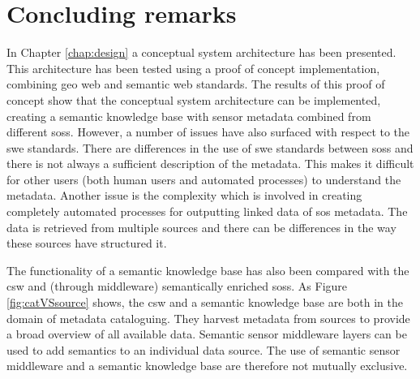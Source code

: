 \section{Concluding remarks}
In Chapter \ref{chap:design} a conceptual system architecture has been presented. This architecture has been tested using a proof of concept implementation, combining geo web and semantic web standards. The results of this proof of concept show that the conceptual system architecture can be implemented, creating a semantic knowledge base with sensor metadata combined from different \aclp{sos}. However, a number of issues have also surfaced with respect to the \ac{swe} standards. There are differences in the use of \ac{swe} standards between \aclp{sos} and there is not always a sufficient description of the metadata. This makes it difficult for other users (both human users and automated processes) to understand the metadata. Another issue is the complexity which is involved in creating completely automated processes for outputting linked data of \ac{sos} metadata. The data is retrieved from multiple sources and there can be differences in the way these sources have structured it. 

The functionality of a semantic knowledge base has also been compared with the \ac{csw} and (through middleware) semantically enriched \aclp{sos}. As Figure \ref{fig:catVSsource} shows, the \ac{csw} and a semantic knowledge base are both in the domain of metadata cataloguing. They harvest metadata from sources to provide a broad overview of all available data. Semantic sensor middleware layers can be used to add semantics to an individual data source. The use of semantic sensor middleware and a semantic knowledge base are therefore not mutually exclusive. 


   
